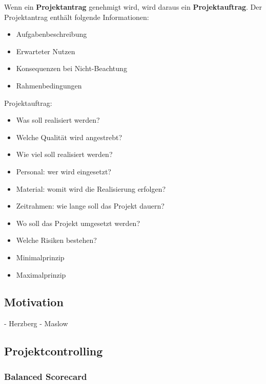 Wenn ein \textbf{Projektantrag} genehmigt wird, wird daraus ein \textbf{Projektauftrag}. Der Projektantrag enthält folgende Informationen:
\begin{itemize}
	 \item Aufgabenbeschreibung
	 \item Erwarteter Nutzen
	 \item Konsequenzen bei Nicht-Beachtung
	 \item Rahmenbedingungen
\end{itemize}
Projektauftrag:
\begin{itemize}
	\item Was soll realisiert werden?
	\item Welche Qualität wird angestrebt?
	\item Wie viel soll realisiert werden?
	\item Personal: wer wird eingesetzt?
	\item Material: womit wird die Realisierung erfolgen?
	\item Zeitrahmen: wie lange soll das Projekt dauern?
	\item Wo soll das Projekt umgesetzt werden?
	\item Welche Risiken bestehen?
\end{itemize}

\begin{itemize}
	\item Minimalprinzip
	\item Maximalprinzip
\end{itemize}


\subsection{Motivation}
- Herzberg
- Maslow

\subsection{Projektcontrolling}
\subsubsection{Balanced Scorecard}